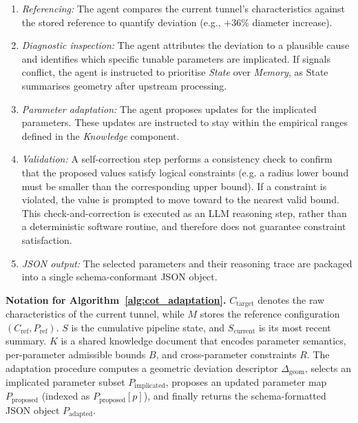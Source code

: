 \documentclass[a4paper,fleqn]{cas-dc}
\begin{document}
{\begin{enumerate}
    \item \emph{Referencing:} The agent compares the current tunnel's characteristics against the stored reference to quantify deviation (e.g., $+36\%$ diameter increase).
    \item \emph{Diagnostic inspection:} The agent attributes the deviation to a plausible cause and identifies which specific tunable parameters are implicated. If signals conflict, the agent is instructed to prioritise \emph{State} over \emph{Memory}, as State summarises geometry after upstream processing.
    \item \emph{Parameter adaptation:} The agent proposes updates for the implicated parameters. These updates are instructed to stay within the empirical ranges defined in the \emph{Knowledge} component.
    \item \emph{Validation:} A self-correction step performs a consistency check to confirm that the proposed values satisfy logical constraints (e.g. a radius lower bound must be smaller than the corresponding upper bound). If a constraint is violated, the value is prompted to move toward to the nearest valid bound. This check-and-correction is executed as an LLM reasoning step, rather than a deterministic software routine, and therefore does not guarantee constraint satisfaction.
    \item \emph{JSON output:} The selected parameters and their reasoning trace are packaged into a single schema-conformant JSON object.
\end{enumerate}

\noindent\textbf{Notation for Algorithm~\ref{alg:cot_adaptation}.} $C_{\text{target}}$ denotes the raw characteristics of the current tunnel, while $M$ stores the reference configuration $(C_{\text{ref}}, P_{\text{ref}})$. $S$ is the cumulative pipeline state, and $S_{\text{current}}$ is its most recent summary. $K$ is a shared knowledge document that encodes parameter semantics, per-parameter admissible bounds $B$, and cross-parameter constraints $R$. The adaptation procedure computes a geometric deviation descriptor $\Delta_{\text{geom}}$, selects an implicated parameter subset $P_{\text{implicated}}$, proposes an updated parameter map $P_{\text{proposed}}$ (indexed as $P_{\text{proposed}}[p]$), and finally returns the schema-formatted JSON object $P_{\text{adapted}}$.

}
\end{document}
